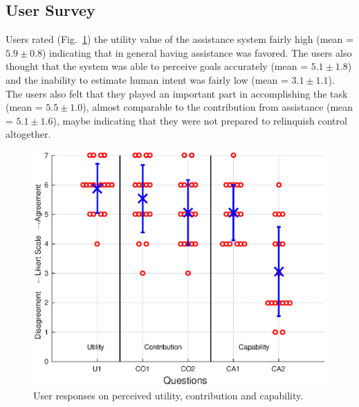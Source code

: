 \documentclass[letterpaper, 10 pt, journal, twoside]{IEEEtran}  %
\begin{document}
	\subsection{User Survey}
	Users rated (Fig.~\ref{US}) the utility value of the assistance system fairly high (mean = $5.9\pm0.8$) indicating that in general having assistance was favored. The users also thought that the system was able to perceive goals accurately (mean = $5.1\pm1.8$) and the inability to estimate human intent was fairly low (mean = $3.1\pm1.1$). The users also felt that they played an important part in accomplishing the task (mean = $5.5\pm1.0$), almost comparable to the contribution from assistance (mean = $5.1\pm1.6$), maybe indicating that they were not prepared to relinquish control altogether.
	\begin{figure}[t]
		\includegraphics[scale = 0.42, center]{./finalfigures/Figure7.eps}
		\vspace{-0.5cm}
		\caption{User responses on perceived utility, contribution and capability.}
		\label{US}
	\end{figure}
	\vspace{-0.08cm}
\end{document}
